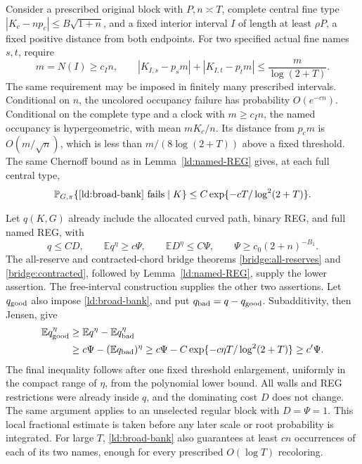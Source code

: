 Consider a prescribed original block with \(P,n\asymp T\), complete
central fine type \(|K_c-np_c|\le B\sqrt{1+n}\), and a fixed
interior interval \(I\) of length at least \(\rho P\), a fixed
positive distance from both endpoints.  For two specified actual
fine names \(s,t\), require
\begin{equation}
 m=N(I)\ge c_In,\qquad
 |K_{I,s}-p_sm|+|K_{I,t}-p_tm|
                  \le\frac{m}{\log(2+T)}.
 \label{ld:broad-bank}
\end{equation}
The same requirement may be imposed in finitely many prescribed
intervals.  Conditional on \(n\), the uncolored occupancy failure
has probability \(O(e^{-cn})\).  Conditional on the complete type
and a clock with \(m\ge c_In\), the named occupancy is
hypergeometric, with mean \(mK_c/n\).  Its distance from \(p_cm\)
is \(O(m/\sqrt n)\), which is less than
\(m/(8\log(2+T))\) above a fixed threshold.  The same Chernoff
bound as in Lemma~\ref{ld:named-REG} gives, at each full central type,
\begin{equation}
 \mathbb P_{G,\pi}\{\eqref{ld:broad-bank}\text{ fails}\mid K\}
            \le C\exp\{-cT/\log^2(2+T)\}.
 \label{ld:broad-failure}
\end{equation}

Let \(q(K,G)\) already include the allocated curved path, binary REG,
and full named REG, with
\begin{equation}
 q\le CD,\qquad \mathbb E q^\eta\ge c\Psi,\qquad
 \mathbb E D^\eta\le C\Psi,\qquad
 \Psi\ge c_0(2+n)^{-B_1}.
 \label{ld:local-inputs}
\end{equation}
The all-reserve and contracted-chord bridge theorems
\ref{bridge:all-reserves} and \ref{bridge:contracted}, followed by
Lemma~\ref{ld:named-REG}, supply the lower assertion.  The free-interval
construction supplies the other two assertions.  Let \(q_{\rm good}\)
also impose \eqref{ld:broad-bank}, and put
\(q_{\rm bad}=q-q_{\rm good}\).  Subadditivity, then Jensen, give
\begin{align}
 \mathbb E q_{\rm good}^\eta
 &\ge\mathbb E q^\eta-\mathbb E q_{\rm bad}^\eta\notag\\
 &\ge c\Psi-(\mathbb E q_{\rm bad})^\eta
 \ge c\Psi-C\exp\{-c\eta T/\log^2(2+T)\}
 \ge c'\Psi.
 \label{ld:local-bank-retention}
\end{align}
The final inequality follows after one fixed threshold enlargement,
uniformly in the compact range of \(\eta\), from the polynomial
lower bound.  All walls and REG restrictions were already inside
\(q\), and the dominating cost \(D\) does not change.  The same
argument applies to an unselected regular block with \(D=\Psi=1\).
This local fractional estimate is taken before any later scale or
root probability is integrated.
For large \(T\), \eqref{ld:broad-bank} also guarantees at least
\(cn\) occurrences of each of its two names, enough for every
prescribed \(O(\log T)\) recoloring.

